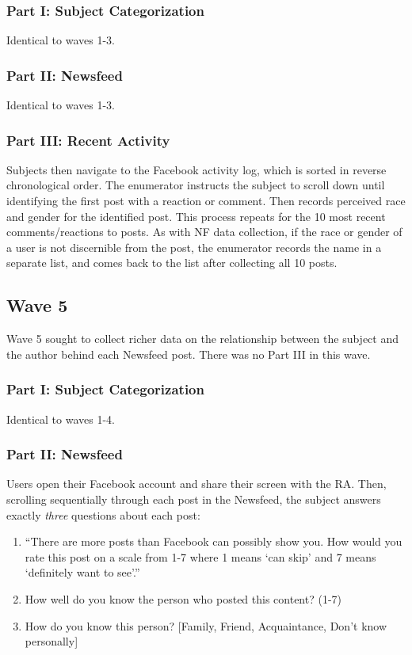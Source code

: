 \documentclass[12pt,letterpaper]{article}
\begin{document}
\subsubsection{Part I: Subject Categorization} Identical to waves 1-3.

\subsubsection{Part II: Newsfeed} Identical to waves 1-3.

\subsubsection{Part III: Recent Activity} Subjects then navigate to the Facebook activity log, which is sorted in reverse chronological order. The enumerator instructs the subject to scroll down until identifying the first post with a reaction or comment. Then records perceived race and gender for the identified post. This process repeats for the 10 most recent comments/reactions to posts. As with NF data collection, if the race or gender of a user is not discernible from the post, the enumerator records the name in a separate list, and comes back to the list after collecting all 10 posts.

\subsection{Wave 5}

Wave 5 sought to collect richer data on the relationship between the subject and the author behind each Newsfeed post. There was no Part III in this wave.

\subsubsection{Part I: Subject Categorization} Identical to waves 1-4.

\subsubsection{Part II: Newsfeed} Users open their Facebook account and share their screen with the RA. Then, scrolling sequentially through each post in the Newsfeed, the subject answers exactly \textit{three} questions about each post: 
\begin{enumerate}
    \item “There are more posts than Facebook can possibly show you. How would you rate this post on a scale from 1-7 where 1 means ‘can skip’ and 7 means ‘definitely want to see’.” 
    \item How well do you know the person who posted this content? (1-7)
    \item How do you know this person? [Family, Friend, Acquaintance, Don’t know personally]
\end{enumerate}
\end{document}
